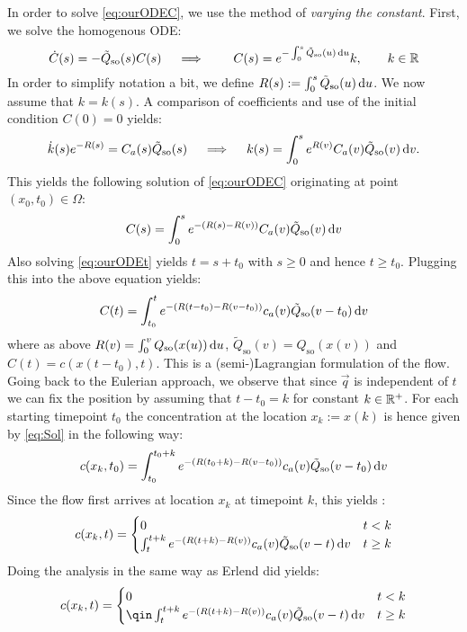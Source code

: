 \documentclass[paper=a4, fontsize=12pt,parskip=half,draft,headings=small]{scrartcl}
\newcommand{\Qso}{Q_{\mathrm{so}}}
\newcommand{\tQso}{\tilde{Q}_{\mathrm{so}}}
\newcommand{\q}{\vec{q}}
\begin{document}
\begin{remark}
			In order to solve \eqref{eq:ourODEC}, we use the method of \emph{varying the constant}. First, we solve the homogenous ODE: 
			\[
				\dot{C}(s) = -\tQso(s)C(s) \quad \implies \quad \quad C(s) = e^{-\int_{0}^s\tQso(u)\diff u} k, \qquad k\in\R
			\]
			In order to simplify notation a bit, we define $R(s):=\int_{0}^s\tQso(u) \diff u$.
			We now assume that $k = k(s)$. A comparison of coefficients and use of the initial condition $C(0)=0$ yields:
			\[
				\dot{k}(s) e^{-R(s)} = C_a(s)\tQso(s) \quad \implies \quad k(s) = \int_{0}^s e^{R(v)}C_a(v)\tQso(v) \diff v.
			\]
			This yields the following solution of \eqref{eq:ourODEC} originating at point $(x_0,t_0) \in \Omega$:
			\[
				C(s) = \int_{0}^{s} e^{-(R(s)-R(v))}C_a(v)\tQso(v)\diff v			
			\]
			Also solving \eqref{eq:ourODEt} yields $t = s + t_0$ with $s \ge 0$ and hence $t \ge t_0$. 
			Plugging this into the above equation yields:
			\begin{equation}
				\label{eq:Sol}
				C(t) = \int_{t_0}^{t} e^{-(R(t-t_0)-R(v-t_0))}c_a(v)\tQso(v-t_0)\diff v
			\end{equation}
			where as above $R(v)=\int_{0}^v\Qso(x(u)) \diff u$, $\tQso(v)=\Qso(x(v))$ and $C(t) = c(x(t-t_0),t)$.
			This is a (semi-)Lagrangian formulation of the flow. 
			Going back to the Eulerian approach, we observe that since $\q$ is independent of $t$ we can fix the position by assuming that $t-t_0=k$ for constant $k\in\mathbb{R}^+$. 
			For each starting timepoint $t_0$ the concentration at the location $x_k:=x(k)$ is hence given by \eqref{eq:Sol} in the following way:
			\[
				c(x_k,t_0) = \int_{t_0}^{t_0+k} e^{-(R(t_0+k)-R(v-t_0))}c_a(v)\tQso(v-t_0)\diff v
			\]
			Since the flow first arrives at location $x_k$ at timepoint $k$, this yields :
			\[
				c(x_k,t) =
				\begin{cases}
					0 & t<k\\
					\int_{t}^{t+k} e^{-(R(t+k)-R(v))}c_a(v)\tQso(v-t)\diff v & t \ge k
				\end{cases} 
			\]
			Doing the analysis in the same way as Erlend did yields:
			\[
				c(x_k,t) =
				\begin{cases}
					0 & t<k\\
					\qin\int_{t}^{t+k} e^{-(R(t+k)-R(v))}c_a(v)\tQso(v-t)\diff v & t \ge k
				\end{cases} 			
			\]
		\end{remark}
		
\end{document}
